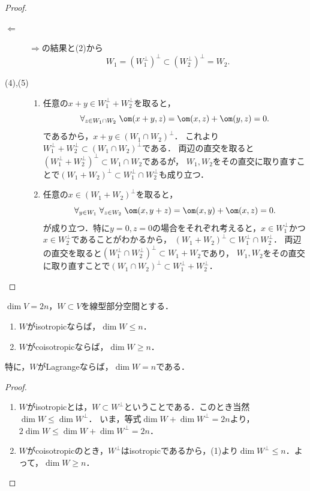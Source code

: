 \documentclass[uplatex,dvipdfmx]{jsarticle}
\begin{document}
\begin{proof}
\begin{enumerate}
\begin{description}
            \item[$\Leftarrow$] $\Rightarrow$の結果と(2)から
            \[W_1=(W_1^\perp)^\perp\subset(W_2^\perp)^\perp=W_2.\]
        \end{description}
    \end{enumerate}
    \begin{description}
        \item[(4),(5)] \mbox{}
        \begin{enumerate}[{Step}1]
            \item 任意の$x+y\in W_1^\perp+W_2^\perp$を取ると，
            \[\forall_{z\in W_1\cap W_2}\;\om(x+y,z)=\om(x,z)+\om(y,z)=0.\]
            であるから，$x+y\in(W_1\cap W_2)^\perp$．
            これより$W_1^\perp+W_2^\perp\subset(W_1\cap W_2)^\perp$である．
            両辺の直交を取ると$(W_1^\perp+W_2^\perp)^\perp\subset W_1\cap W_2$であるが，
            $W_1,W_2$をその直交に取り直すことで$(W_1+W_2)^\perp\subset W_1^\perp\cap W_2^\perp$も成り立つ．
            \item 任意の$x\in(W_1+W_2)^\perp$を取ると，
            \[\forall_{y\in W_1}\;\forall_{z\in W_2}\;\om(x,y+z)=\om(x,y)+\om(x,z)=0.\]
            が成り立つ．特に$y=0,z=0$の場合をそれぞれ考えると，$x\in W_1^\perp$かつ$x\in W_2^\perp$であることがわかるから，
            $(W_1+W_2)^\perp\subset W_1^\perp\cap W_2^\perp$．
            両辺の直交を取ると$(W^\perp_1\cap W^\perp_2)^\perp\subset W_1+W_2$であり，
            $W_1,W_2$をその直交に取り直すことで$(W_1\cap W_2)^\perp\subset W_1^\perp+W_2^\perp$．
        \end{enumerate}
    \end{description}
\end{proof}

\begin{exercise}
    $\dim V=2n$，$W\subset V$を線型部分空間とする．
    \begin{enumerate}
        \item $W$がisotropicならば，$\dim W\le n$．
        \item $W$がcoisotropicならば，$\dim W\ge n$．
    \end{enumerate}
    特に，$W$がLagrangeならば，$\dim W=n$である．
\end{exercise}
\begin{proof}\mbox{}
    \begin{enumerate}
        \item $W$がisotropicとは，$W\subset W^\perp$ということである．このとき当然$\dim W\le\dim W^\perp$．
        いま，等式$\dim W+\dim W^\perp=2n$より，$2\dim W\le\dim W+\dim W^\perp=2n$．
        \item $W$がcoisotropicのとき，$W^\perp$はisotropicであるから，(1)より$\dim W^\perp\le n$．よって，$\dim W\ge n$．
    \end{enumerate}
\end{proof}
\end{document}

